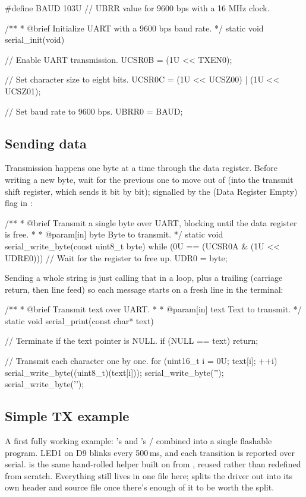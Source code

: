 \begin{ccode}
#define BAUD 103U // UBRR value for 9600 bps with a 16 MHz clock.

/**
 * @brief Initialize UART with a 9600 bps baud rate.
 */
static void serial_init(void)
{
    // Enable UART transmission.
    UCSR0B = (1U << TXEN0);

    // Set character size to eight bits.
    UCSR0C = (1U << UCSZ00) | (1U << UCSZ01);

    // Set baud rate to 9600 bps.
    UBRR0 = BAUD;
}
\end{ccode}

\subsection{Sending data}
\label{c6:a:3}
Transmission happens one byte at a time through the  data register. Before writing a
new byte, wait for the previous one to move out of  (into the transmit shift register,
which sends it bit by bit); signalled by the  (Data Register Empty) flag in
:

\begin{ccode}
/**
 * @brief Transmit a single byte over UART, blocking until the data register is free.
 *
 * @param[in] byte Byte to transmit.
 */
static void serial_write_byte(const uint8_t byte)
{
    while (0U == (UCSR0A & (1U << UDRE0))) {} // Wait for the register to free up.
    UDR0 = byte;
}
\end{ccode}

\noindent Sending a whole string is just calling that in a loop, plus a trailing \code{\r\n}
(carriage return, then line feed) so each message starts on a fresh line in the terminal:

\begin{ccode}
/**
 * @brief Transmit text over UART.
 *
 * @param[in] text Text to transmit.
 */
static void serial_print(const char* text)
{
    // Terminate if the text pointer is NULL.
    if (NULL == text) { return; }

    // Transmit each character one by one.
    for (uint16_t i = 0U; text[i]; ++i)
    {
        serial_write_byte((uint8_t)(text[i]));
    }
    serial_write_byte('\r');
    serial_write_byte('\n');
}
\end{ccode}

\subsection{Simple TX example}
\label{c6:a:4}
A first fully working example: 's  and 's
/\allowbreak{} combined into a single flashable program. LED1 on
D9 blinks every 500\,ms, and each transition is reported over serial.  is the
same hand-rolled helper built on  from , reused rather than
redefined from scratch. Everything still lives in one file here;  splits the driver
out into its own header and source file once there's enough of it to be worth the split.

